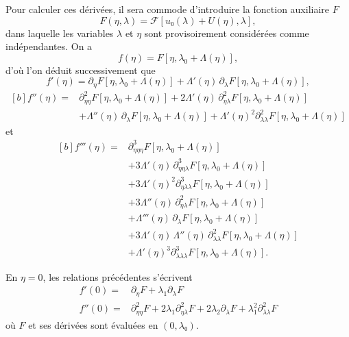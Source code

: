 \documentclass[12pt, final]{amsart}
\begin{document}
Pour calculer ces dérivées, il sera commode d'introduire la fonction auxiliaire
\(F\)
\begin{equation}
  F(η, \lambda)=\mathcal F[u₀(\lambda)+U(η), \lambda],
\end{equation}
dans laquelle les variables \(\lambda\) et \(η\) sont provisoirement
considérées comme indépendantes. On a
\begin{equation}
  f(η)=F[η, \lambda_0+\Lambda(η)],
\end{equation}
d'où l'on déduit successivement que
\begin{equation}
  \label{eq:20211112162417}
  f'(η)=\partial_η F[η, \lambda_0+\Lambda(η)]
  +\Lambda'(η)\,\partial_\lambda F[η, \lambda_0+\Lambda(η)],
\end{equation}
\begin{equation}
  \begin{aligned}[b]
    \label{eq:20211112165810}
    f''(η)={}&\partial_{ηη}^2F[η, \lambda_0+\Lambda(η)]
    +2\Lambda'(η)\,\partial_{η\lambda}^2F[η, \lambda_0+\Lambda(η)]\\
    &+\Lambda''(η)\,\partial_\lambda F[η, \lambda_0+\Lambda(η)]
    +\Lambda'(η)^2\partial_{\lambda\lambda}^2F[η, \lambda_0+\Lambda(η)]
  \end{aligned}
\end{equation}
et
\begin{equation}
  \label{eq:20211112173223}
  \begin{aligned}[b]
    f'''(η)={}&\partial_{ηηη}^3F[η, \lambda_0+\Lambda(η)]\\
    &+3\Lambda'(η)\,\partial_{ηη\lambda}^3F[η, \lambda_0+\Lambda(η)]\\
    &+3\Lambda'(η)^2\partial_{η\lambda\lambda}^3F[η, \lambda_0+\Lambda(η)]\\
    &+3\Lambda''(η)\,\partial_{η\lambda}^2F[η, \lambda_0+\Lambda(η)]\\
    &+\Lambda'''(η)\,\partial_\lambda F[η, \lambda_0+\Lambda(η)]\\
    &+3\Lambda'(η)\,\Lambda''(η)\,\partial_{\lambda\lambda}^2F[η, \lambda_0+\Lambda(η)]\\
    &+\Lambda'(η)^3\partial_{\lambda\lambda\lambda}^3F[η, \lambda_0+\Lambda(η)].
  \end{aligned}
\end{equation}

En \(η=0\), les relations précédentes s'écrivent
\begin{align}
  f'(0)={}&\partial_η F+\lambda_1\partial_\lambda F\\
  f''(0)={}&\partial_{ηη}^2F+2\lambda_1\partial_{η\lambda}^2F
             +2\lambda_2\partial_\lambda F+\lambda_1^2\partial_{\lambda\lambda}^2F
\end{align}
où \(F\) et ses dérivées sont évaluées en \((0, λ₀)\).
\end{document}
